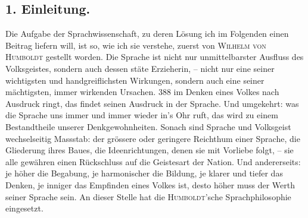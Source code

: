 \subsection*{1. Einleitung.}

Die Aufgabe der Sprachwissenschaft, zu deren Lösung ich im Folgenden einen Beitrag liefern will, ist so, wie ich sie verstehe, zuerst von \label{fp.372} \textsc{Wilhelm von Humboldt} gestellt worden. Die Sprache ist nicht nur unmittelbarster Ausfluss des Volksgeistes, sondern auch dessen stäte Erzieherin, – nicht nur eine seiner wichtigsten und handgreiflichsten Wirkungen, sondern auch eine seiner mächtigsten, immer wirkenden Ursachen.  {\textbar}{\textbar}388{\textbar}{\textbar}\label{sp.388}   im Denken eines Volkes nach Ausdruck ringt, das findet seinen Ausdruck in der Sprache. Und umgekehrt: was die Sprache uns immer und immer wieder in’s Ohr ruft, das wird zu einem Bestandtheile unserer Denkgewohnheiten. Sonach sind Sprache und Volksgeist wechselseitig  Massstab: der grössere oder geringere Reichthum einer Sprache, die Gliederung ihres Baues, die Ideenrichtungen, denen sie mit Vorliebe folgt, – sie alle gewähren einen Rückschluss auf die Geistesart der Nation. Und andererseits: je höher die Begabung, je harmonischer die Bildung, je klarer und tiefer das Denken, je inniger das Empfinden eines Volkes ist, desto höher muss der Werth seiner Sprache sein. An dieser Stelle hat die \textsc{Humboldt}’sche Sprachphilosophie eingesetzt.

\begin{styleAnmerk}
\end{styleAnmerk}

